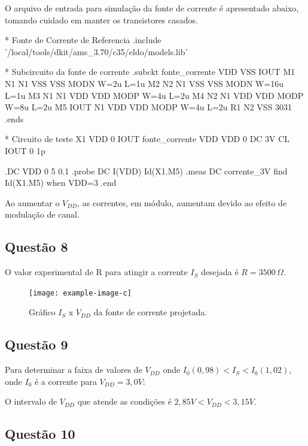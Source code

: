 \documentclass[12pt,a4paper]{article}
\begin{document}
O arquivo de entrada para simulação da fonte de corrente é apresentado abaixo, tomando cuidado em manter os transistores casados.

\begin{codeblock}[title={Arquivo de simulação da fonte de corrente}]
* Fonte de Corrente de Referencia
.include '/local/tools/dkit/ams_3.70/c35/eldo/models.lib'

* Subcircuito da fonte de corrente
.subckt fonte_corrente VDD VSS IOUT
M1 N1 N1 VSS VSS MODN W=2u L=1u
M2 N2 N1 VSS VSS MODN W=16u L=1u
M3 N1 N1 VDD VDD MODP W=4u L=2u
M4 N2 N1 VDD VDD MODP W=8u L=2u
M5 IOUT N1 VDD VDD MODP W=4u L=2u
R1 N2 VSS 3031
.ends

* Circuito de teste
X1 VDD 0 IOUT fonte_corrente
VDD VDD 0 DC 3V
CL IOUT 0 1p

.DC VDD 0 5 0.1
.probe DC I(VDD) Id(X1.M5)
.meas DC corrente_3V find Id(X1.M5) when VDD=3
.end
\end{codeblock}

Ao aumentar o $V_{DD}$, as correntes, em módulo, aumentam devido ao efeito de modulação de canal.

\subsection*{Questão 8}

O valor experimental de R para atingir a corrente $I_S$ desejada é $R = 3500 \, \Omega$.

\begin{figure}[H]
    \centering
    \texttt{[image: example-image-c]}
    \caption{Gráfico $I_S$ x $V_{DD}$ da fonte de corrente projetada.}
    \label{fig:is_vdd}
\end{figure}

\subsection*{Questão 9}

Para determinar a faixa de valores de $V_{DD}$ onde $I_0(0,98) < I_S < I_0(1,02)$, onde $I_0$ é a corrente para $V_{DD} = 3,0V$:

O intervalo de $V_{DD}$ que atende as condições é $2,85V < V_{DD} < 3,15V$.

\subsection*{Questão 10}
\end{document}
